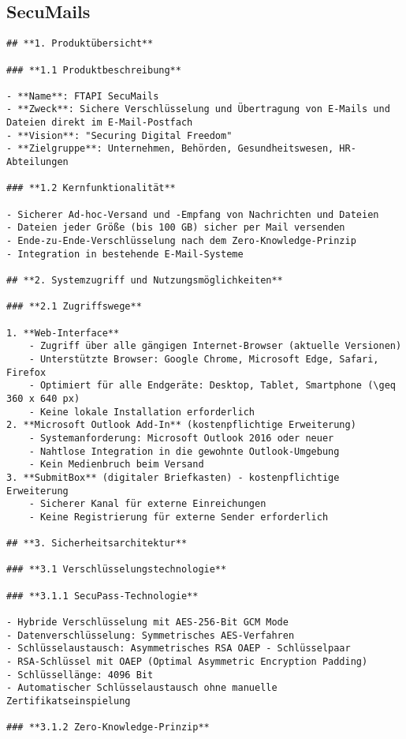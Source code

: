 \subsection{SecuMails}

\begin{Verbatim}[breaklines=true]
## **1. Produktübersicht**

### **1.1 Produktbeschreibung**

- **Name**: FTAPI SecuMails
- **Zweck**: Sichere Verschlüsselung und Übertragung von E-Mails und Dateien direkt im E-Mail-Postfach
- **Vision**: "Securing Digital Freedom"
- **Zielgruppe**: Unternehmen, Behörden, Gesundheitswesen, HR-Abteilungen

### **1.2 Kernfunktionalität**

- Sicherer Ad-hoc-Versand und -Empfang von Nachrichten und Dateien
- Dateien jeder Größe (bis 100 GB) sicher per Mail versenden
- Ende-zu-Ende-Verschlüsselung nach dem Zero-Knowledge-Prinzip
- Integration in bestehende E-Mail-Systeme

## **2. Systemzugriff und Nutzungsmöglichkeiten**

### **2.1 Zugriffswege**

1. **Web-Interface**
    - Zugriff über alle gängigen Internet-Browser (aktuelle Versionen)
    - Unterstützte Browser: Google Chrome, Microsoft Edge, Safari, Firefox
    - Optimiert für alle Endgeräte: Desktop, Tablet, Smartphone (\geq 360 x 640 px)
    - Keine lokale Installation erforderlich
2. **Microsoft Outlook Add-In** (kostenpflichtige Erweiterung)
    - Systemanforderung: Microsoft Outlook 2016 oder neuer
    - Nahtlose Integration in die gewohnte Outlook-Umgebung
    - Kein Medienbruch beim Versand
3. **SubmitBox** (digitaler Briefkasten) - kostenpflichtige Erweiterung
    - Sicherer Kanal für externe Einreichungen
    - Keine Registrierung für externe Sender erforderlich

## **3. Sicherheitsarchitektur**

### **3.1 Verschlüsselungstechnologie**

### **3.1.1 SecuPass-Technologie**

- Hybride Verschlüsselung mit AES-256-Bit GCM Mode
- Datenverschlüsselung: Symmetrisches AES-Verfahren
- Schlüsselaustausch: Asymmetrisches RSA OAEP - Schlüsselpaar
- RSA-Schlüssel mit OAEP (Optimal Asymmetric Encryption Padding)
- Schlüssellänge: 4096 Bit
- Automatischer Schlüsselaustausch ohne manuelle Zertifikatseinspielung

### **3.1.2 Zero-Knowledge-Prinzip**


\end{Verbatim}
